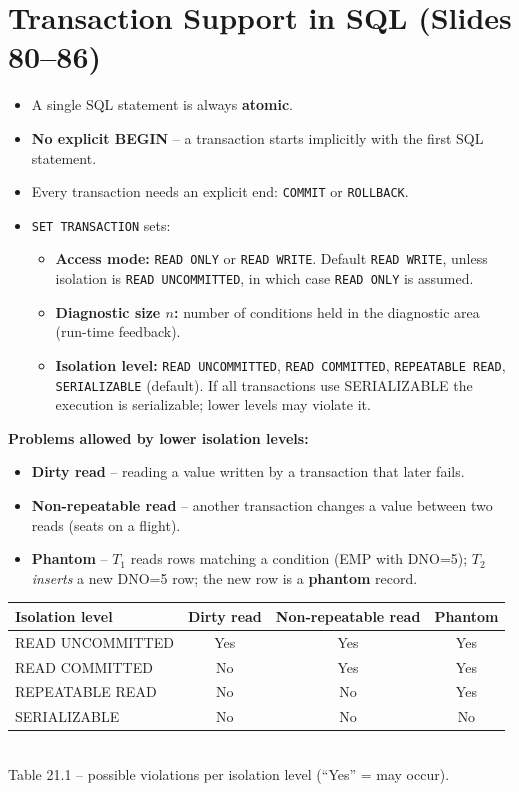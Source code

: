 \documentclass[10pt,a4paper]{article}
\newcommand{\op}[1]{\texttt{#1}}
\begin{document}
\section{Transaction Support in SQL (Slides 80--86)}

\begin{itemize}
  \item A single SQL statement is always \textbf{atomic}.
  \item \textbf{No explicit BEGIN} -- a transaction starts implicitly with the first SQL statement.
  \item Every transaction needs an explicit end: \op{COMMIT} or \op{ROLLBACK}.
  \item \op{SET TRANSACTION} sets:
    \begin{itemize}
      \item \textbf{Access mode:} \op{READ ONLY} or \op{READ WRITE}. Default \op{READ WRITE}, unless isolation is \op{READ UNCOMMITTED}, in which case \op{READ ONLY} is assumed.
      \item \textbf{Diagnostic size $n$:} number of conditions held in the diagnostic area (run-time feedback).
      \item \textbf{Isolation level:} \op{READ UNCOMMITTED}, \op{READ COMMITTED}, \op{REPEATABLE READ}, \op{SERIALIZABLE} (default). If all transactions use SERIALIZABLE the execution is serializable; lower levels may violate it.
    \end{itemize}
\end{itemize}

\textbf{Problems allowed by lower isolation levels:}
\begin{itemize}
  \item \textbf{Dirty read} -- reading a value written by a transaction that later fails.
  \item \textbf{Non-repeatable read} -- another transaction changes a value between two reads (seats on a flight).
  \item \textbf{Phantom} -- $T_1$ reads rows matching a condition (EMP with DNO=5); $T_2$ \emph{inserts} a new DNO=5 row; the new row is a \textbf{phantom} record.
\end{itemize}

\begin{center}
\begin{tabular}{@{}lccc@{}}
\toprule
\textbf{Isolation level} & \textbf{Dirty read} & \textbf{Non-repeatable read} & \textbf{Phantom}\\\midrule
READ UNCOMMITTED & Yes & Yes & Yes\\
READ COMMITTED & No & Yes & Yes\\
REPEATABLE READ & No & No & Yes\\
SERIALIZABLE & No & No & No\\
\bottomrule
\end{tabular}\\[2pt]
{\small Table 21.1 -- possible violations per isolation level (``Yes'' = may occur).}
\end{center}
\end{document}
